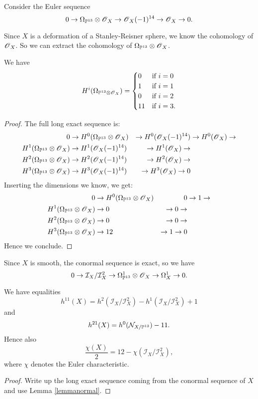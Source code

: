 \documentclass[11pt, english]{article}
\begin{document}
Consider the Euler sequence
\[
0 \to \Omega_{\mathbb{P}^{13}} \otimes \operatorname{\mathscr{O}}_{X} \to \operatorname{\mathscr{O}}_{X}(-1)^{14} \to \operatorname{\mathscr{O}}_X \to 0.
\]

Since $X$ is a deformation of a Stanley-Reisner sphere, we know the cohomology of $\operatorname{\mathscr{O}}_X$. So we can extract the cohomology of $\Omega_{\mathbb{P}^{13}} \otimes \operatorname{\mathscr{O}}_X$.

\begin{lemma}
We have
\[
H^i(\Omega_{\mathbb{P}^{13} \otimes \operatorname{\mathscr{O}}_X}) = \begin{cases}
0 & \text{if } i=0 \\
1 & \text{if } i=1 \\
0 & \text{if } i=2 \\
11 & \text{if } i=3. \\
\end{cases}
\]
\end{lemma}
\begin{proof}
The full long exact sequence is:
\begin{align*}
0 & \to H^0(\Omega_{\mathbb{P}^{13}} \otimes \operatorname{\mathscr{O}}_X) &\to H^0(\operatorname{\mathscr{O}}_X(-1)^{14}) &\to H^0(\operatorname{\mathscr{O}}_X) \to \\
H^1(\Omega_{\mathbb{P}^{13}} \otimes \operatorname{\mathscr{O}}_X) &\to H^1(\operatorname{\mathscr{O}}_X(-1)^{14}) &\to H^1(\operatorname{\mathscr{O}}_X) \to \\
 H^2(\Omega_{\mathbb{P}^{13}} \otimes \operatorname{\mathscr{O}}_X) &\to H^2(\operatorname{\mathscr{O}}_X(-1)^{14}) &\to H^2(\operatorname{\mathscr{O}}_X) \to \\
 H^3(\Omega_{\mathbb{P}^{13}} \otimes \operatorname{\mathscr{O}}_X) &\to H^3(\operatorname{\mathscr{O}}_X(-1)^{14}) &\to H^3(\operatorname{\mathscr{O}}_X) \to 0
\end{align*}
Inserting the dimensions we know, we get:
\begin{align*}
0 & \to H^0(\Omega_{\mathbb{P}^{13}} \otimes \operatorname{\mathscr{O}}_X) & 0  &\to 1 \to \\
H^1(\Omega_{\mathbb{P}^{13}} \otimes \operatorname{\mathscr{O}}_X) &\to 0 &\to 0 \to \\
 H^2(\Omega_{\mathbb{P}^{13}} \otimes \operatorname{\mathscr{O}}_X) &\to 0 &\to 0 \to \\
 H^3(\Omega_{\mathbb{P}^{13}} \otimes \operatorname{\mathscr{O}}_X) &\to 12  &\to 1 \to 0
\end{align*}
Hence we conclude.
\end{proof}

Since $X$ is smooth, the conormal sequence is exact, so we have
\[
0 \to \mathcal I_X/\mathcal I_X^2 \to \Omega^1_{\mathbb{P}^{13}} \otimes \operatorname{\mathscr{O}}_X \to \Omega_X^1 \to 0.
\]

\begin{lemma}
We have equalities
\[
h^{11}(X) = h^2(\mathcal I_X/\mathcal I_X^2)-h^1(\mathcal I_X/\mathcal I_X^2)+1
\]
and 
\[
h^{21}(X) = h^0(\mathcal N_{X/\mathbb{P}^{13}})-11.
\]
Hence also
\[
\frac{\chi (X)}{2} = 12 - \chi(\mathcal I_X/\mathcal I_X^2),
\]
where $\chi$ denotes the Euler characteristic.
\end{lemma}
\begin{proof}
Write up the long exact sequence coming from the conormal sequence of $X$ and use Lemma \ref{lemmanormal}.
\end{proof}





 

\end{document}
